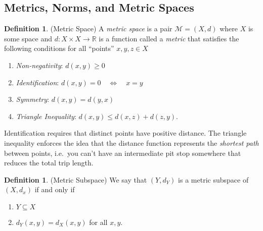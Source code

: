 \documentclass[12pt]{article}
\numberwithin{equation}{section} %
\theoremstyle{plain}
\theoremstyle{definition}
\newtheorem{defn}[thm]{Definition}
\theoremstyle{remark}
\newcommand{\R}{\mathbb{R}}
\begin{document}
\clearpage
\subsection{Metrics, Norms, and Metric Spaces}

\begin{defn}{(Metric Space)}
\label{defn:metric}
A \emph{metric space} is a pair $\mathscr{M}=(X,d)$ where $X$ is some
space and $d:X\times X\rightarrow \R$ is a function
called a \emph{metric} that satisfies the following conditions for all
``points'' $x,y,z\in X$
\begin{enumerate}
  \item \emph{Non-negativity}: $d(x,y)\geq 0$
  \item \emph{Identification}: $d(x,y) = 0 \quad \Leftrightarrow \quad x=y$
  \item \emph{Symmetry}: $d(x,y)=d(y,x)$
  \item \emph{Triangle Inequality}: $d(x,y) \leq d(x,z) + d(z,y)$.
\end{enumerate}
Identification requires that distinct points have positive distance.
The triangle inequality enforces the idea that the distance function
represents the \emph{shortest path} between points, i.e.\ you can't have
an intermediate pit stop somewhere that reduces the total trip length.
\end{defn}
\begin{defn}{(Metric Subspace)}
We say that $(Y,d_Y)$ is a metric subspace of $(X,d_x)$ if and only if
\begin{enumerate}
  \item $Y\subseteq X$
  \item $d_Y(x,y) = d_X(x,y)$ for all $x,y$.
\end{enumerate}
\end{defn}
\end{document}
